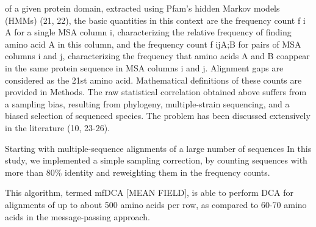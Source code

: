 of a given protein domain, extracted using Pfam's hidden Markov models (HMMs) (21, 22), the basic quantities in this context are the frequency count f i A for a single MSA column i, characterizing the relative frequency of finding amino acid A in this column, and the frequency count f ijA;B for pairs of MSA columns i and j, characterizing the frequency that amino acids A and B coappear in the same protein sequence in MSA columns i and j. Alignment gaps are considered as the 21st amino acid. Mathematical definitions of these counts are provided in Methods. \cite{morcos2011direct}
The raw statistical correlation obtained above suffers from a sampling bias, resulting from phylogeny, multiple-strain sequencing, and a biased selection of sequenced species. The problem has been discussed extensively in the literature (10, 23-26). \cite{morcos2011direct}

Starting with multiple-sequence alignments of a large number of sequences In this study, we implemented a simple sampling correction, by counting sequences with more than 80\% identity and reweighting them in the frequency counts.  \cite{morcos2011direct}

This algorithm, termed mfDCA [MEAN FIELD], is able to perform DCA for alignments of up to about 500 amino acids per row, as compared to 60-70 amino acids in the message-passing approach.  \cite{morcos2011direct}


